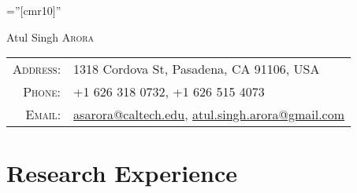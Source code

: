 \documentclass[a4paper,10pt]{article}
\begin{document}

\pagestyle{empty} %

\font\fb=''[cmr10]'' %

		{\Huge Atul Singh \textsc{Arora}}    


\begin{tabular}{rl}
    \textsc{\color{gray} Address:}   & 1318 Cordova St, Pasadena, CA 91106, USA \\
    \textsc{\color{gray} Phone:}     & +1 626 318 0732,
                        +1 626 515 4073\\
    \textsc{\color{gray} Email:}     & \href{mailto:asarora@caltech.edu}{asarora@caltech.edu}, \href{mailto:atul.singh.arora@gmail.com}{atul.singh.arora@gmail.com}%
\end{tabular}


\section{Research Experience}
\end{document}

